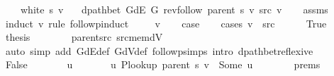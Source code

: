 \begin{isabellebody}
\ \ \ {\isachardoublequoteopen}{\isasymnot}\ white\ s\ v{\isachardoublequoteclose}\isanewline
\ \ \ {\isachardoublequoteopen}dpath{\isacharunderscore}{\kern0pt}bet\ {\isacharparenleft}{\kern0pt}G{\isachardot}{\kern0pt}dE\ G{\isacharparenright}{\kern0pt}\ {\isacharparenleft}{\kern0pt}rev{\isacharunderscore}{\kern0pt}follow\ {\isacharparenleft}{\kern0pt}parent\ s{\isacharparenright}{\kern0pt}\ v{\isacharparenright}{\kern0pt}\ src\ v{\isachardoublequoteclose}\isanewline
%
\isadelimproof
\ \ %
\endisadelimproof
%
\isatagproof
{}\isamarkupfalse%
\ assms\isanewline
{}\isamarkupfalse%
\ {\isacharparenleft}{\kern0pt}induct\ v\ rule{\isacharcolon}{\kern0pt}\ follow{\isacharunderscore}{\kern0pt}pinduct{\isacharparenright}{\kern0pt}\isanewline
\ \ \isamarkupfalse%
\ {\isacharparenleft}{\kern0pt}{}\ v{\isacharparenright}{\kern0pt}\isanewline
\ \ \isamarkupfalse%
\ {\isacharquery}{\kern0pt}case\isanewline
\ \ \isamarkupfalse%
\ {\isacharparenleft}{\kern0pt}cases\ {\isachardoublequoteopen}v\ {\isacharequal}{\kern0pt}\ src{\isachardoublequoteclose}{\isacharparenright}{\kern0pt}\isanewline
\ \ \ \ \isamarkupfalse%
\ True\isanewline
\ \ \ \ \isamarkupfalse%
\ {\isacharquery}{\kern0pt}thesis\isanewline
\ \ \ \ \ \ \isamarkupfalse%
\ parent{\isacharunderscore}{\kern0pt}src\ src{\isacharunderscore}{\kern0pt}mem{\isacharunderscore}{\kern0pt}dV\isanewline
\ \ \ \ \ \ \isamarkupfalse%
\ {\isacharparenleft}{\kern0pt}auto\ simp\ add{\isacharcolon}{\kern0pt}\ G{\isachardot}{\kern0pt}dE{\isacharunderscore}{\kern0pt}def\ G{\isachardot}{\kern0pt}dV{\isacharunderscore}{\kern0pt}def\ follow{\isacharunderscore}{\kern0pt}psimps\ intro{\isacharcolon}{\kern0pt}\ dpath{\isacharunderscore}{\kern0pt}bet{\isacharunderscore}{\kern0pt}reflexive{\isacharparenright}{\kern0pt}\isanewline
\ \ \isamarkupfalse%
\isanewline
\ \ \ \ \isamarkupfalse%
\ False\isanewline
\ \ \ \ \isamarkupfalse%
\ \isamarkupfalse%
\ u\ \isanewline
\ \ \ \ \ \ u{\isacharcolon}{\kern0pt}\ {\isachardoublequoteopen}P{\isacharunderscore}{\kern0pt}lookup\ {\isacharparenleft}{\kern0pt}parent\ s{\isacharparenright}{\kern0pt}\ v\ {\isacharequal}{\kern0pt}\ Some\ u{\isachardoublequoteclose}\isanewline
\ \ \ \ \ \ \isamarkupfalse%
\ {\isachardoublequoteopen}{}{\isachardot}{\kern0pt}prems{\isachardoublequoteclose}\isanewline

\end{isabellebody}
